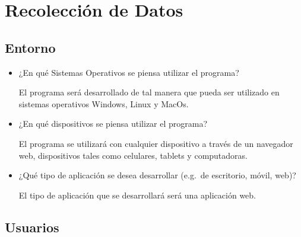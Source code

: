     \restoregeometry %

    \clearpage
    \tableofcontents

    \clearpage
    \listoffigures

    \clearpage


    \clearpage
    \vspace*{6pt}
	\centerline{\textbf{\huge \theTitle}}
    \vspace*{8pt}


	\section{Recolección de Datos}

	\subsection{Entorno}

	\begin{itemize}
		\item ¿En qué Sistemas Operativos se piensa utilizar el programa?

			El programa será desarrollado de tal manera que pueda ser utilizado en sistemas
			operativos Windows, Linux y MacOs.

		\item ¿En qué dispositivos se piensa utilizar el programa?

			El programa se utilizará con cualquier dispositivo a través de un navegador web,
			dispositivos tales como celulares, tablets y computadoras.

		\item ¿Qué tipo de aplicación se desea desarrollar (e.g.~de escritorio, móvil,
			web)?

			El tipo de aplicación que se desarrollará será una aplicación web.
	\end{itemize}

	\subsection{Usuarios}

